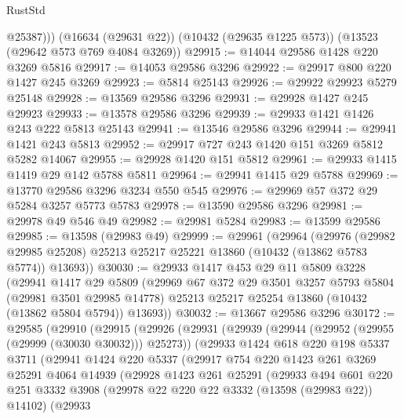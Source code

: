 \begin{lexlean}{RustStd}
\begin{coremodule}
          @25387)))
    (@16634 (@29631 @22))
    (@10432 (@29635 @1225 @573))
    (@13523 (@29642 @573 @769 @4084 @3269))
@29915 := @14044 @29586 @1428 @220 @3269 @5816
@29917 := @14053 @29586 @3296
@29922 := @29917 @800 @220 @1427 @245 @3269
@29923 := @5814 @25143
@29926 := @29922 @29923 @5279 @25148
@29928 := @13569 @29586 @3296
@29931 := @29928 @1427 @245 @29923
@29933 := @13578 @29586 @3296
@29939 := @29933 @1421 @1426 @243 @222 @5813 @25143
@29941 := @13546 @29586 @3296
@29944 := @29941 @1421 @243 @5813
@29952 := @29917 @727 @243 @1420 @151 @3269 @5812 @5282 @14067
@29955 := @29928 @1420 @151 @5812
@29961 := @29933 @1415 @1419 @29 @142 @5788 @5811
@29964 := @29941 @1415 @29 @5788
@29969 := @13770 @29586 @3296 @3234 @550 @545
@29976 := @29969 @57 @372 @29 @5284 @3257 @5773 @5783
@29978 := @13590 @29586 @3296
@29981 := @29978 @49 @546 @49
@29982 := @29981 @5284
@29983 := @13599 @29586
@29985 := @13598 (@29983 @49)
@29999 := @29961
    (@29964
      (@29976
        (@29982 @29985 @25208)
        @25213
        @25217
        @25221
        @13860
        (@10432 (@13862 @5783 @5774))
        @13693))
@30030 := @29933
    @1417
    @453
    @29
    @11
    @5809
    @3228
    (@29941
      @1417
      @29
      @5809
      (@29969
        @67
        @372
        @29
        @3501
        @3257
        @5793
        @5804
        (@29981 @3501 @29985 @14778)
        @25213
        @25217
        @25254
        @13860
        (@10432 (@13862 @5804 @5794))
        @13693))
@30032 := @13667 @29586 @3296
@30172 := @29585
    (@29910
      (@29915
        (@29926
          (@29931
            (@29939
              (@29944 (@29952 (@29955 (@29999 (@30030 @30032))) @25273))
              (@29933
                @1424
                @618
                @220
                @198
                @5337
                @3711
                (@29941
                  @1424
                  @220
                  @5337
                  (@29917
                    @754
                    @220
                    @1423
                    @261
                    @3269
                    @25291
                    @4064
                    @14939
                    (@29928
                      @1423
                      @261
                      @25291
                      (@29933
                        @494
                        @601
                        @220
                        @251
                        @3332
                        @3908
                        (@29978 @22 @220 @22 @3332 (@13598 (@29983 @22)) @14102)
                        (@29933

\end{coremodule}
\end{lexlean}
